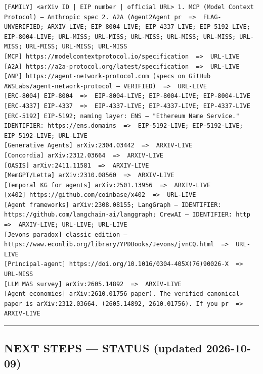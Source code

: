 \documentclass[
]{article}
\begin{document}
\begin{Verbatim}[breaklines,breakanywhere,fontsize=\small]
[FAMILY] <arXiv ID | EIP number | official URL> 1. MCP (Model Context Protocol) — Anthropic spec 2. A2A (Agent2Agent pr  =>  FLAG-UNVERIFIED; ARXIV-LIVE; EIP-8004-LIVE; EIP-4337-LIVE; EIP-5192-LIVE; EIP-8004-LIVE; URL-MISS; URL-MISS; URL-MISS; URL-MISS; URL-MISS; URL-MISS; URL-MISS; URL-MISS; URL-MISS
[MCP] https://modelcontextprotocol.io/specification  =>  URL-LIVE
[A2A] https://a2a-protocol.org/latest/specification  =>  URL-LIVE
[ANP] https://agent-network-protocol.com (specs on GitHub AWSLabs/agent-network-protocol — VERIFIED)  =>  URL-LIVE
[ERC-8004] EIP-8004  =>  EIP-8004-LIVE; EIP-8004-LIVE; EIP-8004-LIVE
[ERC-4337] EIP-4337  =>  EIP-4337-LIVE; EIP-4337-LIVE; EIP-4337-LIVE
[ERC-5192] EIP-5192; naming layer: ENS — "Ethereum Name Service." IDENTIFIER: https://ens.domains  =>  EIP-5192-LIVE; EIP-5192-LIVE; EIP-5192-LIVE; URL-LIVE
[Generative Agents] arXiv:2304.03442  =>  ARXIV-LIVE
[Concordia] arXiv:2312.03664  =>  ARXIV-LIVE
[OASIS] arXiv:2411.11581  =>  ARXIV-LIVE
[MemGPT/Letta] arXiv:2310.08560  =>  ARXIV-LIVE
[Temporal KG for agents] arXiv:2501.13956  =>  ARXIV-LIVE
[x402] https://github.com/coinbase/x402  =>  URL-LIVE
[Agent frameworks] arXiv:2308.08155; LangGraph — IDENTIFIER: https://github.com/langchain-ai/langgraph; CrewAI — IDENTIFIER: http  =>  ARXIV-LIVE; URL-LIVE; URL-LIVE
[Jevons paradox] classic edition — https://www.econlib.org/library/YPDBooks/Jevons/jvnCQ.html  =>  URL-LIVE
[Principal-agent] https://doi.org/10.1016/0304-405X(76)90026-X  =>  URL-MISS
[LLM MAS survey] arXiv:2605.14892  =>  ARXIV-LIVE
[Agent economies] arXiv:2610.01756 paper). The verified canonical paper is arXiv:2312.03664. (2605.14892, 2610.01756). If you pr  =>  ARXIV-LIVE
\end{Verbatim}

\begin{center}\rule{0.5\linewidth}{0.5pt}\end{center}

\subsection{NEXT STEPS --- STATUS (updated
2026-10-09)}\label{next-steps--status-updated-2026-10-09}
\end{document}
